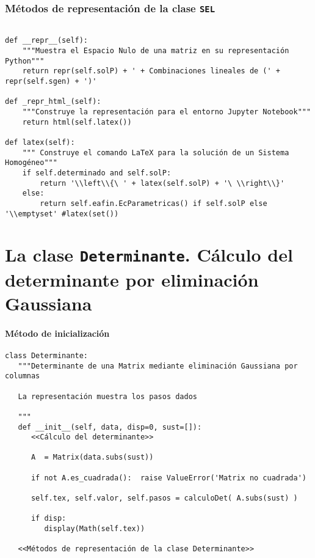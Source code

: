 \documentclass[11pt]{report}
\begin{document}
\section{Métodos de representación de la clase \texttt{SEL}}
\label{sec:orgcfa79ab}

\begin{verbatim}

def __repr__(self):
    """Muestra el Espacio Nulo de una matriz en su representación Python"""
    return repr(self.solP) + ' + Combinaciones lineales de (' + repr(self.sgen) + ')'

def _repr_html_(self):
    """Construye la representación para el entorno Jupyter Notebook"""
    return html(self.latex())

def latex(self):
    """ Construye el comando LaTeX para la solución de un Sistema Homogéneo"""
    if self.determinado and self.solP:
        return '\\left\\{\ ' + latex(self.solP) + '\ \\right\\}'
    else:
        return self.eafin.EcParametricas() if self.solP else '\\emptyset' #latex(set())

\end{verbatim}


\part{La clase \texttt{Determinante}. Cálculo del determinante por eliminación Gaussiana}
\label{sec:org3a2ef92}

\subsection{Método de inicialización}
\label{sec:orge4211a1}

\begin{verbatim}
class Determinante:
   """Determinante de una Matrix mediante eliminación Gaussiana por columnas
   
   La representación muestra los pasos dados
   
   """
   def __init__(self, data, disp=0, sust=[]):
      <<Cálculo del determinante>>
      
      A  = Matrix(data.subs(sust))
      
      if not A.es_cuadrada():  raise ValueError('Matrix no cuadrada')
      
      self.tex, self.valor, self.pasos = calculoDet( A.subs(sust) )
      
      if disp:
         display(Math(self.tex))

   <<Métodos de representación de la clase Determinante>>
         
\end{verbatim}
\end{document}
